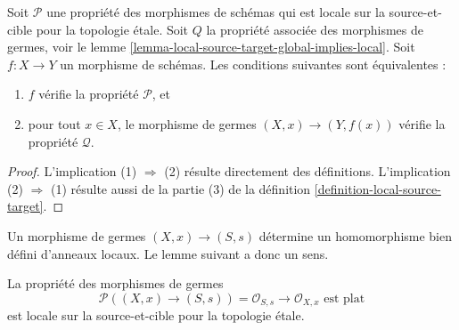 \begin{lemma}
\label{lemma-local-source-target-local-implies-global}
Soit $\mathcal{P}$ une propriété des morphismes de schémas qui est
locale sur la source-et-cible pour la topologie \'etale. Soit $Q$ la
propriété associée des morphismes de germes, voir le
lemme \ref{lemma-local-source-target-global-implies-local}.
Soit $f : X \to Y$ un morphisme de schémas. Les conditions suivantes
sont équivalentes :
\begin{enumerate}
\item $f$ vérifie la propriété $\mathcal{P}$, et
\item pour tout $x \in X$, le morphisme de germes
$(X, x) \to (Y, f(x))$ vérifie la propriété $\mathcal{Q}$.
\end{enumerate}
\end{lemma}

\begin{proof}
L'implication (1) $\Rightarrow$ (2) résulte directement des définitions.
L'implication (2) $\Rightarrow$ (1) résulte aussi de la partie (3) de la
définition \ref{definition-local-source-target}.
\end{proof}

\noindent
Un morphisme de germes $(X, x) \to (S, s)$ détermine un homomorphisme
bien défini d'anneaux locaux. Le lemme suivant a donc un sens.

\begin{lemma}
\label{lemma-flat-at-point}
La propriété des morphismes de germes
$$
\mathcal{P}((X, x) \to (S, s)) =
\mathcal{O}_{S, s} \to \mathcal{O}_{X, x}\text{ est plat}
$$
est locale sur la source-et-cible pour la topologie \'etale.
\end{lemma}

